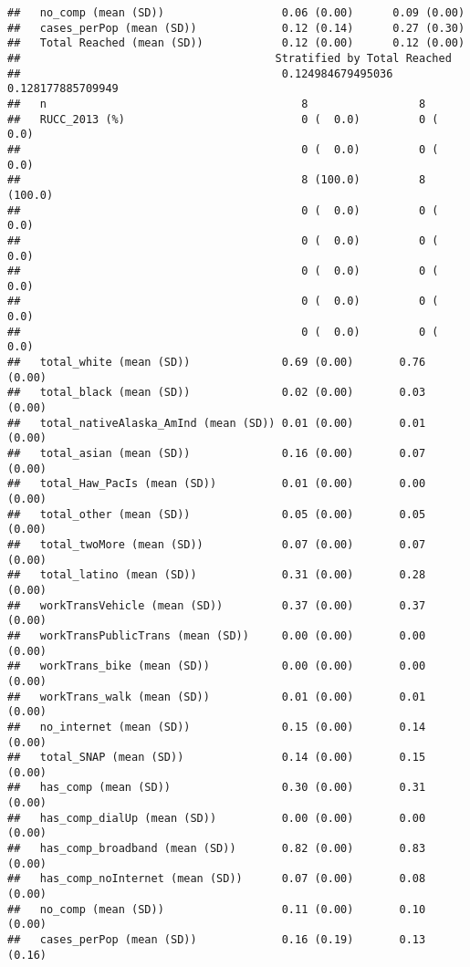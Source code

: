 \documentclass[
]{article}
\begin{document}
\begin{verbatim}
##   no_comp (mean (SD))                  0.06 (0.00)      0.09 (0.00)      
##   cases_perPop (mean (SD))             0.12 (0.14)      0.27 (0.30)      
##   Total Reached (mean (SD))            0.12 (0.00)      0.12 (0.00)      
##                                       Stratified by Total Reached
##                                        0.124984679495036 0.128177885709949
##   n                                       8                 8             
##   RUCC_2013 (%)                           0 (  0.0)         0 (  0.0)     
##                                           0 (  0.0)         0 (  0.0)     
##                                           8 (100.0)         8 (100.0)     
##                                           0 (  0.0)         0 (  0.0)     
##                                           0 (  0.0)         0 (  0.0)     
##                                           0 (  0.0)         0 (  0.0)     
##                                           0 (  0.0)         0 (  0.0)     
##                                           0 (  0.0)         0 (  0.0)     
##   total_white (mean (SD))              0.69 (0.00)       0.76 (0.00)      
##   total_black (mean (SD))              0.02 (0.00)       0.03 (0.00)      
##   total_nativeAlaska_AmInd (mean (SD)) 0.01 (0.00)       0.01 (0.00)      
##   total_asian (mean (SD))              0.16 (0.00)       0.07 (0.00)      
##   total_Haw_PacIs (mean (SD))          0.01 (0.00)       0.00 (0.00)      
##   total_other (mean (SD))              0.05 (0.00)       0.05 (0.00)      
##   total_twoMore (mean (SD))            0.07 (0.00)       0.07 (0.00)      
##   total_latino (mean (SD))             0.31 (0.00)       0.28 (0.00)      
##   workTransVehicle (mean (SD))         0.37 (0.00)       0.37 (0.00)      
##   workTransPublicTrans (mean (SD))     0.00 (0.00)       0.00 (0.00)      
##   workTrans_bike (mean (SD))           0.00 (0.00)       0.00 (0.00)      
##   workTrans_walk (mean (SD))           0.01 (0.00)       0.01 (0.00)      
##   no_internet (mean (SD))              0.15 (0.00)       0.14 (0.00)      
##   total_SNAP (mean (SD))               0.14 (0.00)       0.15 (0.00)      
##   has_comp (mean (SD))                 0.30 (0.00)       0.31 (0.00)      
##   has_comp_dialUp (mean (SD))          0.00 (0.00)       0.00 (0.00)      
##   has_comp_broadband (mean (SD))       0.82 (0.00)       0.83 (0.00)      
##   has_comp_noInternet (mean (SD))      0.07 (0.00)       0.08 (0.00)      
##   no_comp (mean (SD))                  0.11 (0.00)       0.10 (0.00)      
##   cases_perPop (mean (SD))             0.16 (0.19)       0.13 (0.16)      

\end{verbatim}
\end{document}
